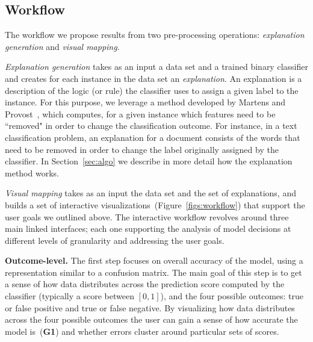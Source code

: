 \subsection{Workflow}
\label{sec:workflow}


The workflow we propose results from two pre-processing operations: \textit{explanation generation} and \textit{visual mapping}.

\textit{Explanation generation} takes as an input a data set and a trained binary classifier and creates for each instance in the data set an \textit{explanation}. An explanation is a description of the logic (or rule) the classifier uses to assign a given label to the instance. For this purpose, we leverage a method developed by Martens and Provost~\cite{martens2007comprehensible}, which computes, for a given instance which features need to be ``removed" in order to change the classification outcome. For instance, in a text classification problem, an explanation for a document consists of the words that need to be removed in order to change the label originally assigned by the classifier. In Section~\ref{sec:algo} we describe in more detail how the explanation method works.

\textit{Visual mapping} takes as an input the data set and the set of explanations, and builds a set of interactive visualizations~(Figure~\ref{figs:workflow}) that support the user goals we outlined above. The interactive workflow revolves around three main linked interfaces; each one supporting the analysis of model decisions at different levels of granularity and addressing the user goals. 


\par \noindent \textbf{Outcome-level.} The first step focuses on overall accuracy of the model, using a representation similar to a confusion matrix. The main goal of this step is to get a sense of how data distributes across the prediction score computed by the classifier (typically a score between $[0, 1]$), and the four possible outcomes: true or false positive and true or false negative. By visualizing how data distributes across the four possible outcomes the user can gain a sense of how accurate the model is~(\textbf{G1}) and whether errors cluster around particular sets of scores.
    
